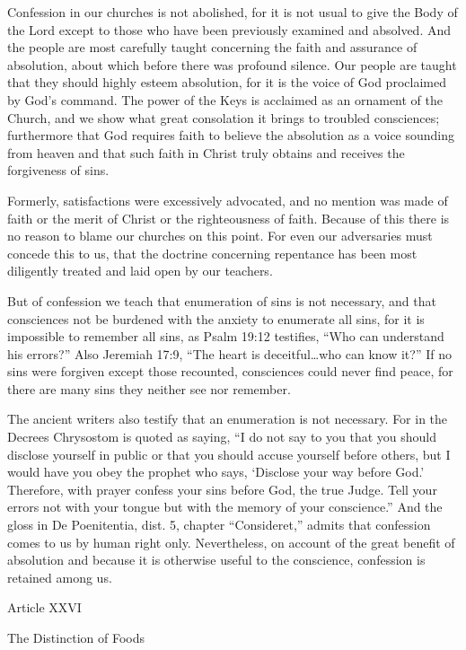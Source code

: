 Confession in our churches is not abolished, for it is not usual to give the Body of the Lord except to those who have been previously examined and absolved. And the people are most carefully taught concerning the faith and assurance of absolution, about which before there was profound silence. Our people are taught that they should highly esteem absolution, for it is the voice of God proclaimed by God’s command. The power of the Keys is acclaimed as an ornament of the Church, and we show what great consolation it brings to troubled consciences; furthermore that God requires faith to believe the absolution as a voice sounding from heaven and that such faith in Christ truly obtains and receives the forgiveness of sins.

Formerly, satisfactions were excessively advocated, and no mention was made of faith or the merit of Christ or the righteousness of faith. Because of this there is no reason to blame our churches on this point. For even our adversaries must concede this to us, that the doctrine concerning repentance has been most diligently treated and laid open by our teachers.

But of confession we teach that enumeration of sins is not necessary, and that consciences not be burdened with the anxiety to enumerate all sins, for it is impossible to remember all sins, as Psalm 19:12 testifies, “Who can understand his errors?” Also Jeremiah 17:9, “The heart is deceitful…who can know it?” If no sins were forgiven except those recounted, consciences could never find peace, for there are many sins they neither see nor remember.

The ancient writers also testify that an enumeration is not necessary. For in the Decrees Chrysostom is quoted as saying, “I do not say to you that you should disclose yourself in public or that you should accuse yourself before others, but I would have you obey the prophet who says, ‘Disclose your way before God.’ Therefore, with prayer confess your sins before God, the true Judge. Tell your errors not with your tongue but with the memory of your conscience.” And the gloss in De Poenitentia, dist. 5, chapter “Consideret,” admits that confession comes to us by human right only. Nevertheless, on account of the great benefit of absolution and because it is otherwise useful to the conscience, confession is retained among us.

 

Article XXVI

The Distinction of Foods

